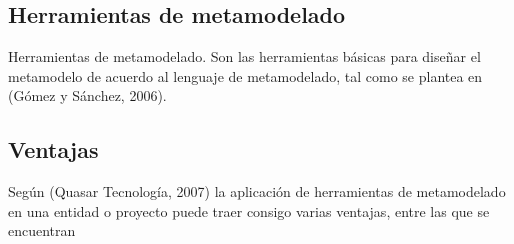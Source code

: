 \subsection{Herramientas de metamodelado}
\begin{spacing}{2.0}
\end{spacing}
Herramientas de metamodelado. Son las herramientas básicas para diseñar el metamodelo de acuerdo al lenguaje de metamodelado, tal como se plantea en (Gómez y Sánchez, 2006).

\subsection{Ventajas}
\begin{spacing}{2.0}
\end{spacing}

Según (Quasar Tecnología, 2007) la aplicación de herramientas de metamodelado en una entidad o proyecto puede traer consigo varias ventajas, entre las que se encuentran

\begin{spacing}{2.0}
\end{spacing}

